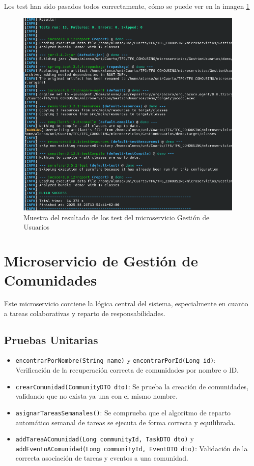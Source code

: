 Los test han sido pasados todos correctamente, cómo se puede ver en la imagen \ref{fig:test-result}
\begin{figure}[H]
  \centering
  \includegraphics[width=1\textwidth]{fotos/resultadotest-micro-GestionUsuarios.png}
  \caption{Muestra del resultado de los test del microservicio Gestión de Usuarios}
  \label{fig:test-result}
\end{figure}
\section{Microservicio de Gestión de Comunidades}
Este microservicio contiene la lógica central del sistema, especialmente en cuanto a tareas colaborativas y reparto de responsabilidades.

\subsection{Pruebas Unitarias}
\begin{itemize}
    \item \texttt{encontrarPorNombre(String name)} y \texttt{encontrarPorId(Long id)}: Verificación de la recuperación correcta de comunidades por nombre o ID.
    \item \texttt{crearComunidad(CommunityDTO dto)}: Se prueba la creación de comunidades, validando que no exista ya una con el mismo nombre.
    \item \texttt{asignarTareasSemanales()}: Se comprueba que el algoritmo de reparto automático semanal de tareas se ejecuta de forma correcta y equilibrada.
    \item \texttt{addTareaAComunidad(Long communityId, TaskDTO dto)} y \newline \texttt{addEventoAComunidad(Long communityId, EventDTO dto)}: Validación de la correcta asociación de tareas y eventos a una comunidad.
\end{itemize}

